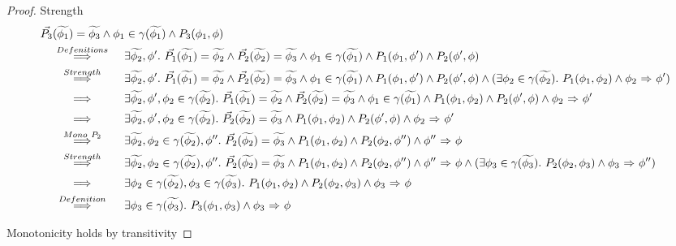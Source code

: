 \begin{proof}
    Strength
    \begin{align*}
    & \vec{P_3}(\widetilde{\phi_1}) = \widetilde{\phi_3} \wedge \phi_1 \in \gamma(\widetilde{\phi_1}) \wedge P_3(\phi_1, \phi)\\
    & \overset{Defenitions}{~\quad\quad\implies\quad\quad~} 
        \exists \widetilde{\phi_2}, \phi'.~ 
        \vec{P_1}(\widetilde{\phi_1}) = \widetilde{\phi_2} \wedge \vec{P_2}(\widetilde{\phi_2}) = \widetilde{\phi_3} \wedge 
        \phi_1 \in \gamma(\widetilde{\phi_1}) \wedge P_1(\phi_1, \phi') \wedge P_2(\phi', \phi)\\
    & \overset{Strength}{~\quad\quad\implies\quad\quad~} 
        \exists \widetilde{\phi_2}, \phi'.~ 
        \vec{P_1}(\widetilde{\phi_1}) = \widetilde{\phi_2} \wedge \vec{P_2}(\widetilde{\phi_2}) = \widetilde{\phi_3} \wedge 
        \phi_1 \in \gamma(\widetilde{\phi_1}) \wedge P_1(\phi_1, \phi') \wedge P_2(\phi', \phi)
        \wedge (\exists \phi_2 \in \gamma(\widetilde{\phi_2}).~ P_1(\phi_1, \phi_2) \wedge {\phi_2} \,\,{\Rightarrow}\,\, {\phi'}) \\
    & \overset{}{~\quad\quad\implies\quad\quad~} 
        \exists \widetilde{\phi_2}, \phi', \phi_2 \in \gamma(\widetilde{\phi_2}).~ 
        \vec{P_1}(\widetilde{\phi_1}) = \widetilde{\phi_2} \wedge \vec{P_2}(\widetilde{\phi_2}) = \widetilde{\phi_3} \wedge 
        \phi_1 \in \gamma(\widetilde{\phi_1}) \wedge P_1(\phi_1, \phi_2) \wedge P_2(\phi', \phi)
        \wedge {\phi_2} \,\,{\Rightarrow}\,\, {\phi'} \\
    & \overset{}{~\quad\quad\implies\quad\quad~} 
        \exists \widetilde{\phi_2}, \phi', \phi_2 \in \gamma(\widetilde{\phi_2}).~ 
        \vec{P_2}(\widetilde{\phi_2}) = \widetilde{\phi_3} \wedge 
        P_1(\phi_1, \phi_2) \wedge P_2(\phi', \phi)
        \wedge {\phi_2} \,\,{\Rightarrow}\,\, {\phi'} \\
    & \overset{Mono~P_2}{~\quad\quad\implies\quad\quad~} 
        \exists \widetilde{\phi_2}, \phi_2 \in \gamma(\widetilde{\phi_2}), \phi''.~ 
        \vec{P_2}(\widetilde{\phi_2}) = \widetilde{\phi_3} \wedge 
        P_1(\phi_1, \phi_2) \wedge P_2(\phi_2, \phi'')
        \wedge {\phi''} \,\,{\Rightarrow}\,\, {\phi} \\
    & \overset{Strength}{~\quad\quad\implies\quad\quad~} 
        \exists \widetilde{\phi_2}, \phi_2 \in \gamma(\widetilde{\phi_2}), \phi''.~ 
        \vec{P_2}(\widetilde{\phi_2}) = \widetilde{\phi_3} \wedge 
        P_1(\phi_1, \phi_2) \wedge P_2(\phi_2, \phi'') 
        \wedge {\phi''} \,\,{\Rightarrow}\,\, {\phi} \wedge
        (\exists \phi_3 \in \gamma(\widetilde{\phi_3}).~ P_2(\phi_2, \phi_3) \wedge {\phi_3} \,\,{\Rightarrow}\,\, {\phi''}) \\
    & \overset{}{~\quad\quad\implies\quad\quad~} 
        \exists \phi_2 \in \gamma(\widetilde{\phi_2}), \phi_3 \in \gamma(\widetilde{\phi_3}).~ 
        P_1(\phi_1, \phi_2) \wedge P_2(\phi_2, \phi_3)
        \wedge {\phi_3} \,\,{\Rightarrow}\,\, {\phi} \\
    & \overset{Defenition}{~\quad\quad\implies\quad\quad~} 
        \exists \phi_3 \in \gamma(\widetilde{\phi_3}).~ 
        P_3(\phi_1, \phi_3)
        \wedge {\phi_3} \,\,{\Rightarrow}\,\, {\phi} 
    \end{align*}
    
    Monotonicity
    holds by transitivity
\end{proof}
